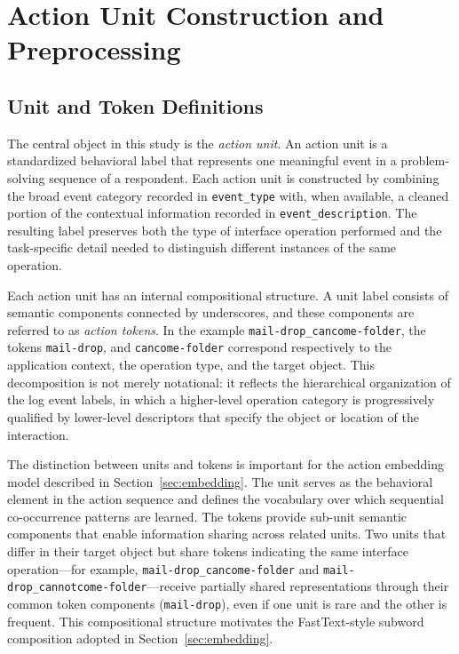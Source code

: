 \documentclass[A4paper,11pt]{article}
\begin{document}
\section{Action Unit Construction and Preprocessing}
\subsection{Unit and Token Definitions}\label{sec:unit_token}

The central object in this study is the \emph{action unit}. An action unit is a standardized behavioral label that represents one meaningful event in a problem-solving sequence of a respondent. Each action unit is constructed by combining the broad event category recorded in \texttt{event\_type} with, when available, a cleaned portion of the contextual information recorded in \texttt{event\_description}. The resulting label preserves both the type of interface operation performed and the task-specific detail needed to distinguish different instances of the same operation.

Each action unit has an internal compositional structure. A unit label consists of semantic components connected by underscores, and these components are referred to as \emph{action tokens}. In the example \texttt{mail-drop\_cancome-folder}, the tokens \texttt{mail-drop}, and \texttt{cancome-folder} correspond respectively to the application context, the operation type, and the target object. This decomposition is not merely notational: it reflects the hierarchical organization of the log event labels, in which a higher-level operation category is progressively qualified by lower-level descriptors that specify the object or location of the interaction.

The distinction between units and tokens is important for the action embedding model described in Section~\ref{sec:embedding}. The unit serves as the behavioral element in the action sequence and defines the vocabulary over which sequential co-occurrence patterns are learned. The tokens provide sub-unit semantic components that enable information sharing across related units. Two units that differ in their target object but share tokens indicating the same interface operation---for example, \texttt{mail-drop\_cancome-folder} and \texttt{mail-drop\_cannotcome-folder}---receive partially shared representations through their common token components (\texttt{mail-drop}), even if one unit is rare and the other is frequent. This compositional structure motivates the FastText-style subword composition adopted in Section~\ref{sec:embedding}.
\end{document}
